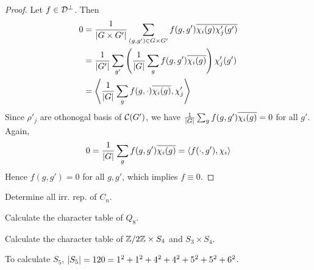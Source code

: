 \begin{theorem}
\begin{proof}
  Let $f \in \mathcal{D}^\perp$. Then
  \begin{align*}
    0 &= \frac{1}{\lvert G\times G'\rvert} \sum_{(g,g')\in G\times G'}
    f(g,g')\overline{\chi_i(g)\chi_j'(g')} \\
    &= \frac{1}{\lvert G'\rvert} \sum_{g'} \left( \frac{1}{\lvert G\rvert}\sum_g f(g, g') \overline{\chi_i(g)} \right) \chi'_j(g') \\
    &= \left\langle \frac{1}{\lvert G\rvert} \sum_g f(g, \cdot) \overline{\chi_i(g)}, \chi'_j \right\rangle
  \end{align*}
  Since $\rho'_j$ are othonogal basis of $\mathcal{C}(G')$, we have $\frac{1}{\lvert G\rvert} \sum_g f(g, g') \overline{\chi_i(g)}
  = 0$ for all $g'$.
  Again,
  \[ 0 = \frac{1}{\lvert G\rvert} \sum_g f(g, g') \overline{\chi_i(g)} = \langle f(\cdot, g'), \chi_i\rangle \]
  Hence $f(g, g') = 0$ for all $g, g'$, which implies $f \equiv 0$.
\end{proof}

\end{theorem}

\begin{exercise}
  Determine all irr. rep. of $C_n$.
\end{exercise}

\begin{exercise}
  Calculate the character table of $Q_8$.
\end{exercise}

\begin{exercise}
  Calculate the character table of ${\mathbb{Z}}/{2\mathbb{Z}}\times S_4$ and
  $S_3\times S_4$.
\end{exercise}

To calculate $S_5$, $\lvert S_5\rvert = 120 = 1^2 + 1^2 + 4^2 + 4^2 + 5^2 + 5^2 + 6^2$.
